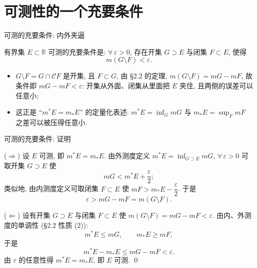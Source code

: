 
\section[充要条件]{可测性的一个充要条件}


\begin{frame}{可测的充要条件: 内外夹逼}

\begin{thm}[可测的内外夹逼刻画]
有界集 $E \subset \mathbb{R}$ 可测的\alert{充要条件}是: $\forall\, \varepsilon > 0$, 存在开集 $G \supset E$ 与闭集 $F \subset E$, 使得
\[
m(G \setminus F) < \varepsilon .
\]
\end{thm}

\vspace{2em}
\pause

\begin{remark}
\begin{itemize}
\item $G \setminus F = G \cap \mathscr{C}F$ 是\alert{开集}, 且 $F \subset G$, 由 §2.2 的定理,
$m(G \setminus F) = mG - mF$, 故条件即 $mG - mF < \varepsilon$: \alert{开集从外面、闭集从里面把 $E$ 夹住}, 且两侧的误差可以任意小;
\item 这正是 ``$m^* E = m_* E$'' 的定量化表述: $m^* E = \inf_G mG$ 与 $m_* E = \sup_F mF$ 之差可以被压得任意小.
\end{itemize}
\end{remark}

\end{frame}


\begin{frame}{可测的充要条件: 证明}

\startproof[bg=yellow, fg=red]($\Longrightarrow$)
设 $E$ 可测, 即 $m^* E = m_* E$. 由外测度定义 $m^* E = \inf_{G \supset E} mG$, $\forall\, \varepsilon > 0$ 可取开集 $G \supset E$ 使
\[
mG < m^* E + \frac{\varepsilon}{2} ;
\]
类似地, 由内测度定义可取闭集 $F \subset E$ 使 $mF > m_* E - \dfrac{\varepsilon}{2}$.
于是
\[
\varepsilon > mG - mF = m(G \setminus F).
\]

\pause

\startproof[bg=yellow, fg=red]($\Longleftarrow$)
设有开集 $G \supset E$ 与闭集 $F \subset E$ 使 $m(G \setminus F) = mG - mF < \varepsilon$. 由内、外测度的单调性 (§2.2 性质 (2)):
\[
m^* E \leqslant mG, \qquad m_* E \geqslant mF,
\]
于是
\[
m^* E - m_* E \leqslant mG - mF < \varepsilon .
\]
由 $\varepsilon$ 的任意性得 $m^* E = m_* E$, 即 $E$ 可测.
\qed

\end{frame}

